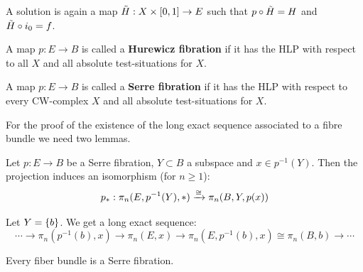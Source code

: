 A solution is again a map $\tilde H:X\times[0,1]\to E$ such that $p\circ\tilde H=H$ and $\tilde H\circ i_0=f$.

A map $p:E\to B$ is called a \textbf{Hurewicz fibration} if it has the HLP with respect to all $X$ and all absolute test-situations for $X$.

A map $p:E\to B$ is called a \textbf{Serre fibration} if it has the HLP with respect to every CW-complex $X$ and all absolute test-situations for $X$.

For the proof of the existence of the long exact sequence associated to a fibre bundle we need two lemmas.

\begin{lemma}
Let $p:E\to B$ be a Serre fibration, $Y\subset B$ a subspace and $x\in p^{-1}(Y)$. Then the projection induces an isomorphism (for $n\geq 1$):
\[p_*:\pi_n(E,p^{-1}(Y),*)\xrightarrow{\cong}\pi_n(B,Y,p(x))\]
\end{lemma}

\begin{corollary}
Let $Y=\{b\}$. We get a long exact sequence:
\[\cdots\to\pi_n(p^{-1}(b),x)\to\pi_n(E,x)\to\pi_n(E,p^{-1}(b),x)\cong\pi_n(B,b)\to\cdots\]
\end{corollary}

\begin{lemma}
Every fiber bundle is a Serre fibration.
\end{lemma}
